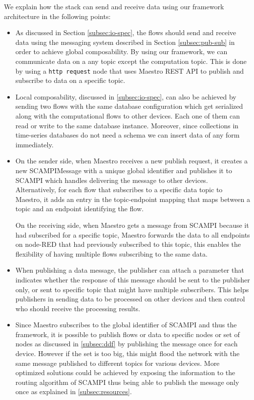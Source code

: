 We explain how the stack can send and receive data using our framework architecture in the following points:
\begin{itemize}
\item As discussed in Section \ref{subsec:io-spec}, the flows should send and receive data using the messaging system described in Section \ref{subsec:pub-sub} in order to achieve global composability. By using our framework, we can communicate data on a any topic except the computation topic. This is done  by using a \verb|http request| node that uses Maestro REST API to publish and subscribe to data on a specific topic.\\

\item Local composability, discussed in  \ref{subsec:io-spec}, can also be achieved by sending two flows with the same database configuration which get serialized along with the computational flows to other devices. Each one of them can read or write to the same database instance. Moreover, since collections in time-series databases do not need a schema we can insert  data of any form immediately. 

\item On the sender side, when Maestro receives a new publish request, it creates a new SCAMPIMessage with a unique global identifier and publishes it to SCAMPI which handles delivering the message to other devices. Alternatively, for each flow that subscribes to a specific data topic to Maestro, it  adds an entry in the topic-endpoint mapping that maps between a topic and an endpoint identifying the flow. 

On the receiving side, when Maestro gets a message from SCAMPI because it had subscribed for a specific topic, Maestro forwards the data to all endpoints on node-RED that had previously subscribed to this topic, this enables the flexibility of having multiple flows subscribing to the same data.\\


\item When  publishing a data message, the publisher can attach a parameter that indicates whether the response of this message should be sent to the publisher only, or sent to specific topic that might have multiple subscribers. This helps publishers in sending data to be processed on other devices and then control who should receive the processing results.\\


\item Since Maestro subscribes to the global identifier of SCAMPI and thus the framework, it is possible to publish flows or data to specific nodes or set of nodes as discussed in \ref{subsec:ddf} by  publishing the message once for each device. However if the set is too big, this might flood the network with the same message published to different topics for various devices. More optimized solutions could be achieved by exposing the information to the routing algorithm of SCAMPI thus being able to publish the message only once as explained in \ref{subsec:resources}. \\



\end{itemize}
